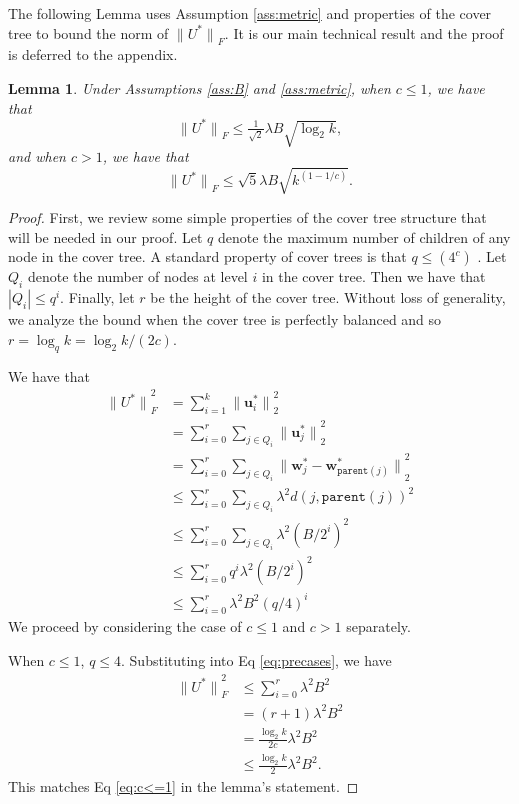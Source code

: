\documentclass[twoside]{article}
\newtheorem{lemma}{Lemma}
\newcommand{\parent}[1]{\texttt{parent}({#1})}
\renewcommand{\star}[1]{{#1}^{*}}
\newcommand{\uu}{\mathbf u}
\newcommand{\w}{\mathbf w}
\newcommand{\ltwo}[1]{{\lVert {#1} \rVert}_2}
\newcommand{\lF}[1]{{\lVert {#1} \rVert}_F}
\begin{document}
{The following Lemma uses Assumption \ref{ass:metric} and properties of the cover tree to bound the norm of $\lF{\star U}$.
It is our main technical result and the proof is deferred to the appendix.

\begin{lemma}
    \label{lemma:main}
    Under Assumptions \ref{ass:B} and \ref{ass:metric},
    when $c\le1$, we have that
    \begin{equation}
        \lF{\star U} \le \tfrac{1}{\sqrt2}\lambda B \sqrt{\log_2 k},
        \label{eq:c<=1}
    \end{equation}
    and when $c>1$, we have that
    \begin{equation}
        \lF{\star U} \le \sqrt{5}\lambda B \sqrt{k^{(1-1/c)}}.
        \label{eq:c>1}
    \end{equation}
\end{lemma}

\begin{proof}
    First, we review some simple properties of the cover tree structure that will be needed in our proof.
    Let $q$ denote the maximum number of children of any node in the cover tree.
    A standard property of cover trees is that $q \le (4^c)$ \citep[Lemma 25]{izbickithesis}.
    Let $Q_i$ denote the number of nodes at level $i$ in the cover tree.
    Then we have that $|Q_i| \le q^i.$
    Finally, let $r$ be the height of the cover tree.
    Without loss of generality, we analyze the bound when the cover tree is perfectly balanced and so $r = \log_q k = \log_2 k / (2c)$.

We have that
\begin{align}
    \lF{\star U}^2
    &= \sum_{i=1}^k \ltwo{\star\uu_i}^2 \\
    &= \sum_{i=0}^r \sum_{j\in Q_i} \ltwo{\star\uu_j}^2 \\
    &= \sum_{i=0}^r \sum_{j\in Q_i} \ltwo{\star\w_j - \star\w_{\parent{j}}}^2 \\
    &\le \sum_{i=0}^r \sum_{j\in Q_i} \lambda^2 d(j, \parent{j})^2 \\
    &\le \sum_{i=0}^r \sum_{j\in Q_i} \lambda^2 (B/2^i)^2 \\
    &\le \sum_{i=0}^r q^i \lambda^2 (B/2^i)^2 \\
    &\le \sum_{i=0}^r \lambda^2 B^2 (q/4)^i 
    \label{eq:precases}
\end{align}
We proceed by considering the case of $c\le1$ and $c>1$ separately.

When $c\le1$, $q\le4$.
Substituting into Eq \eqref{eq:precases}, we have
\begin{align}
    \lF{\star U}^2
    &\le \sum_{i=0}^r \lambda^2 B^2 \\
    &= (r+1) \lambda^2 B^2 \\
    &= \frac{\log_2k}{2c} \lambda^2 B^2 \\
    &\le \frac{\log_2k}{2} \lambda^2 B^2
    .
\end{align}
This matches Eq \eqref{eq:c<=1} in the lemma's statement.


\end{proof}}
\end{document}
